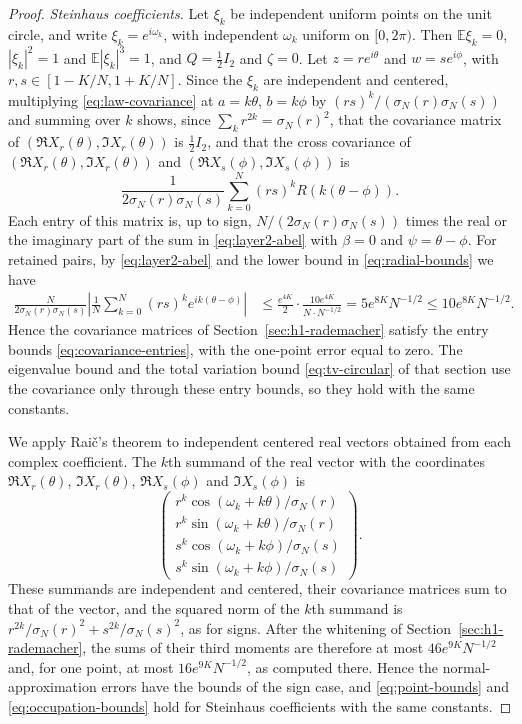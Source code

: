\begin{proof}
\medskip
\noindent\emph{Steinhaus coefficients.}
Let $\xi_k$ be independent uniform points on the unit circle, and write
$\xi_k=e^{i\omega_k}$, with independent $\omega_k$ uniform on
$[0,2\pi)$.
Then $\mathbb E\xi_k=0$, $|\xi_k|^2=1$ and $\mathbb E|\xi_k|^3=1$, and
$Q=\tfrac12I_2$ and $\zeta=0$.
Let $z=re^{i\theta}$ and $w=se^{i\phi}$, with $r,s\in[1-K/N,1+K/N]$.
Since the $\xi_k$ are independent and centered, multiplying
\eqref{eq:law-covariance} at $a=k\theta$, $b=k\phi$ by
$(rs)^k/(\sigma_N(r)\sigma_N(s))$ and summing over $k$ shows, since
$\sum_kr^{2k}=\sigma_N(r)^2$, that the covariance matrix of
$(\Re X_r(\theta),\Im X_r(\theta))$ is $\tfrac12I_2$, and that the cross
covariance of $(\Re X_r(\theta),\Im X_r(\theta))$ and
$(\Re X_s(\phi),\Im X_s(\phi))$ is
\[
 \frac1{2\sigma_N(r)\sigma_N(s)}\sum_{k=0}^N(rs)^kR(k(\theta-\phi)).
\]
Each entry of this matrix is, up to sign,
$N/(2\sigma_N(r)\sigma_N(s))$ times the real or the imaginary part of the
sum in \eqref{eq:layer2-abel} with $\beta=0$ and $\psi=\theta-\phi$.
For retained pairs, by \eqref{eq:layer2-abel} and the lower bound in
\eqref{eq:radial-bounds} we have
\begin{align*}
 \frac N{2\sigma_N(r)\sigma_N(s)}
 \left|\frac1N\sum_{k=0}^N(rs)^ke^{ik(\theta-\phi)}\right|
 &\le\frac{e^{4K}}2\cdot\frac{10e^{4K}}{N\cdot N^{-1/2}}
 =5e^{8K}N^{-1/2}\le10e^{8K}N^{-1/2}.
\end{align*}
Hence the covariance matrices of Section~\ref{sec:h1-rademacher}
satisfy the entry bounds \eqref{eq:covariance-entries}, with the one-point
error equal to zero. The eigenvalue bound and the total variation bound
\eqref{eq:tv-circular} of that section use the covariance only through
these entry bounds, so they hold with the same constants.

We apply Rai\v{c}'s theorem to independent centered real vectors obtained
from each complex coefficient.
The $k$th summand of the real vector with the coordinates
$\Re X_r(\theta)$, $\Im X_r(\theta)$, $\Re X_s(\phi)$ and $\Im X_s(\phi)$
is
\[
 \begin{pmatrix}
 r^k\cos(\omega_k+k\theta)/\sigma_N(r)\\
 r^k\sin(\omega_k+k\theta)/\sigma_N(r)\\
 s^k\cos(\omega_k+k\phi)/\sigma_N(s)\\
 s^k\sin(\omega_k+k\phi)/\sigma_N(s)
 \end{pmatrix}.
\]
These summands are independent and centered, their covariance matrices
sum to that of the vector, and the squared norm of the $k$th summand is
$r^{2k}/\sigma_N(r)^2+s^{2k}/\sigma_N(s)^2$, as for signs.
After the whitening of Section~\ref{sec:h1-rademacher}, the sums of their
third moments are therefore at most $46e^{9K}N^{-1/2}$ and, for one point,
at most $16e^{9K}N^{-1/2}$, as computed there.
Hence the normal-approximation errors have the bounds of the sign case,
and \eqref{eq:point-bounds} and \eqref{eq:occupation-bounds} hold for
Steinhaus coefficients with the same constants.


\end{proof}
